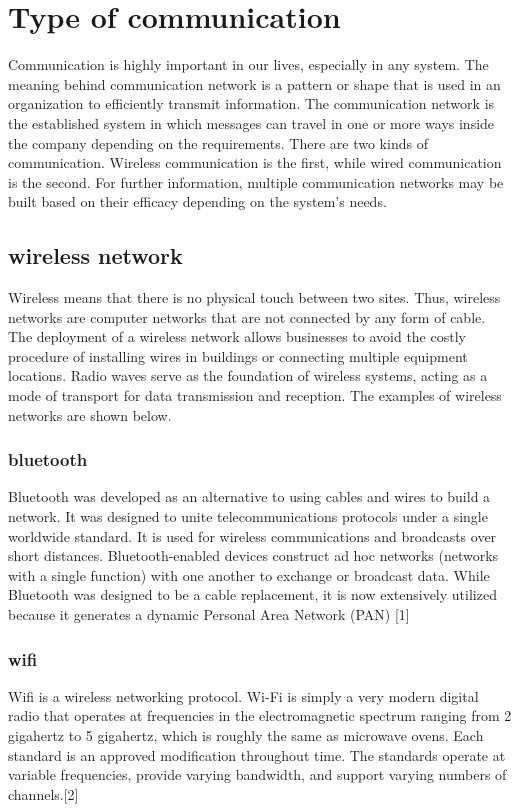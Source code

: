 \section{Type of communication}
Communication is highly important in our lives, especially in any system. The meaning behind communication network is a pattern or shape that is used in an organization to efficiently transmit information. The communication network is the established system in which messages can travel in one or more ways inside the company depending on the requirements. There are two kinds of communication. Wireless communication is the first, while wired communication is the second. For further information, multiple communication networks may be built based on their efficacy depending on the system's needs. 

\subsection{wireless network}
Wireless means that there is no physical touch between two sites. Thus, wireless networks are computer networks that are not connected by any form of cable. The deployment of a wireless network allows businesses to avoid the costly procedure of installing wires in buildings or connecting multiple equipment locations. Radio waves serve as the foundation of wireless systems, acting as a mode of transport for data transmission and reception. The examples of wireless networks are shown below.
\subsubsection{bluetooth}
Bluetooth was developed as an alternative to using cables and wires to build a network. It was designed to unite telecommunications protocols under a single worldwide standard. It is used for wireless communications and broadcasts over short distances. Bluetooth-enabled devices construct ad hoc networks (networks with a single function) with one another to exchange or broadcast data. While Bluetooth was designed to be a cable replacement, it is now extensively utilized because it generates a dynamic Personal Area Network (PAN) [1]

\subsubsection{wifi}
Wifi is a wireless networking protocol. Wi-Fi is simply a very modern digital radio that operates at frequencies in the electromagnetic spectrum ranging from 2 gigahertz to 5 gigahertz, which is roughly the same as microwave ovens. Each standard is an approved modification throughout time. The standards operate at variable frequencies, provide varying bandwidth, and support varying numbers of channels.[2]

